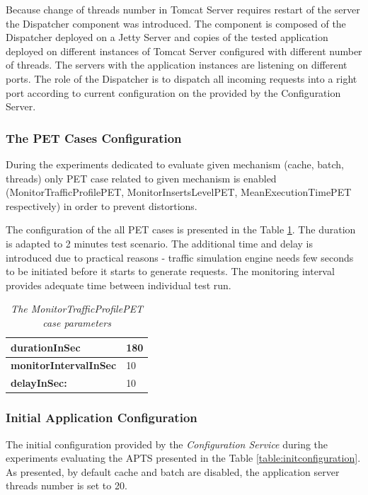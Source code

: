 \documentclass[10pt,a4paper]{article}
\begin{document}
Because change of threads number in Tomcat Server requires restart of the server the Dispatcher component was introduced. The component is composed of the Dispatcher deployed on a Jetty Server and copies of the tested application deployed on different instances of Tomcat Server configured with different number of threads. The servers with the application instances are listening on different ports. The role of the Dispatcher is to dispatch all incoming requests into a right port according to current configuration on the provided by the Configuration Server.


\subsubsection{The PET Cases Configuration}

During the experiments dedicated to evaluate given mechanism (cache, batch, threads) only PET case related to given mechanism is enabled (MonitorTrafficProfilePET, MonitorInsertsLevelPET, MeanExecutionTimePET respectively) in order to prevent distortions. 

The configuration of the all PET cases is presented in the Table \ref{evaluationtestconf}. The duration is adapted to 2 minutes test scenario. The additional time and delay is introduced due to practical reasons - traffic simulation engine needs few seconds to be initiated before it starts to generate requests. The monitoring interval provides adequate time between individual test run.

\begin{table}[!htb]
\def\arraystretch{1.5}
\caption{\textit{The MonitorTrafficProfilePET case parameters}} \label{evaluationtestconf}
\begin{tabularx}{\textwidth}{X|X}

\textbf{durationInSec} & 180 \\ \hline
\textbf{monitorIntervalInSec} & 10 \\ \hline
\textbf{delayInSec:} & 10\\
\end{tabularx}
\end{table}


\subsubsection{Initial Application Configuration}

The initial configuration provided by the \textit{Configuration Service} during the experiments evaluating the APTS presented in the Table \ref{table:initconfiguration}. As presented, by default cache and batch are disabled, the application server threads number is set to 20. 
\end{document}
